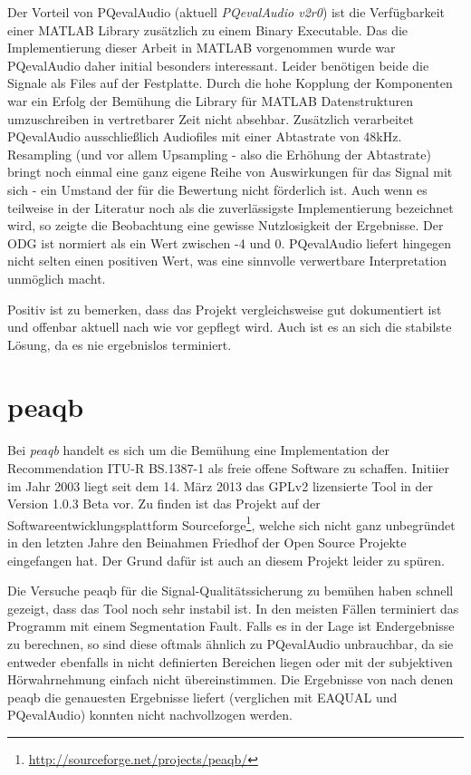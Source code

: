 Der Vorteil von PQevalAudio (aktuell \textit{PQevalAudio v2r0}) ist die Verfügbarkeit einer MATLAB Library zusätzlich zu einem Binary Executable. Das die Implementierung dieser Arbeit in MATLAB vorgenommen wurde war PQevalAudio daher initial besonders interessant. Leider benötigen beide die Signale als Files auf der Festplatte. Durch die hohe Kopplung der Komponenten war ein Erfolg der Bemühung die Library für MATLAB Datenstrukturen umzuschreiben in vertretbarer Zeit nicht absehbar. Zusätzlich verarbeitet PQevalAudio ausschließlich Audiofiles mit einer Abtastrate von 48kHz. Resampling (und vor allem Upsampling - also die Erhöhung der Abtastrate) bringt noch einmal eine ganz eigene Reihe von Auswirkungen für das Signal mit sich - ein Umstand der für die Bewertung nicht förderlich ist. Auch wenn es teilweise in der Literatur noch als die zuverlässigste Implementierung bezeichnet wird\cite{nishimura2013objective}, so zeigte die Beobachtung eine gewisse Nutzlosigkeit der Ergebnisse. Der ODG ist normiert als ein Wert zwischen -4 und 0. PQevalAudio liefert hingegen nicht selten einen positiven Wert, was eine sinnvolle verwertbare Interpretation unmöglich macht.

Positiv ist zu bemerken, dass das Projekt vergleichsweise gut dokumentiert ist und offenbar aktuell nach wie vor gepflegt wird. Auch ist es an sich die stabilste Lösung, da es nie ergebnislos terminiert.

\section{peaqb}

Bei \textit{peaqb} handelt es sich um die Bemühung eine Implementation der Recommendation ITU-R BS.1387-1 als freie offene Software zu schaffen. Initiier im Jahr 2003 liegt seit dem 14. März 2013 das GPLv2 lizensierte Tool in der Version 1.0.3 Beta vor. Zu finden ist das Projekt auf der Softwareentwicklungsplattform Sourceforge\footnote{\url{http://sourceforge.net/projects/peaqb/}}, welche sich nicht ganz unbegr\"undet in den letzten Jahre den Beinahmen \glqq Friedhof der Open Source Projekte\grqq{} eingefangen hat. Der Grund daf\"ur ist auch an diesem Projekt leider zu sp\"uren. 

Die Versuche peaqb für die Signal-Qualitätssicherung zu bem\"uhen haben schnell gezeigt, dass das Tool noch sehr instabil ist. In den meisten Fällen terminiert das Programm mit einem Segmentation Fault. Falls es in der Lage ist Endergebnisse zu berechnen, so sind diese oftmals ähnlich zu PQevalAudio unbrauchbar, da sie entweder ebenfalls in nicht definierten Bereichen liegen oder mit der subjektiven H\"orwahrnehmung einfach nicht \"ubereinstimmen. Die Ergebnisse von \cite{kondo2012use} nach denen peaqb die genauesten Ergebnisse liefert (verglichen mit EAQUAL und PQevalAudio) konnten nicht nachvollzogen werden.

